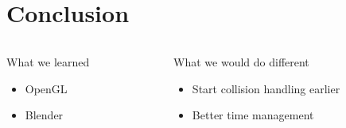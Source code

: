 \section{Conclusion}
\begin{frame}
	\begin{columns}[t]
		\begin{column}{0.5\textwidth}
			\begin{block}{What we learned}
				\begin{itemize}
					\item OpenGL
					\item Blender
				\end{itemize}
			\end{block}
		\end{column}
		\pause
		\begin{column}{0.5\textwidth}
			\begin{block}{What we would do different}
				\begin{itemize}
					\item Start collision handling earlier
					\item Better time management
				\end{itemize}
			\end{block}
		\end{column}
	\end{columns}
\end{frame}

